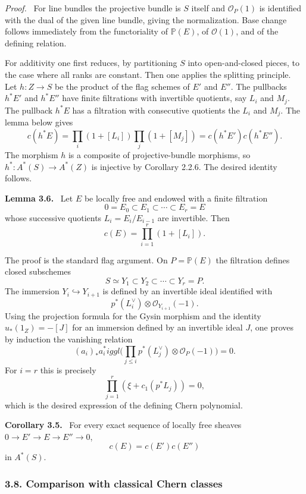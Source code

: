 \documentclass[14pt]{extarticle}
\newcommand{\cO}{\mathcal O}
\newenvironment{statement}[1]{\par\medskip\noindent\textbf{#1.}\ }{\par\medskip}
\newenvironment{prooftext}[1][Proof]{\par\noindent\emph{#1.}\ }{\par\medskip}
\begin{document}
\begin{prooftext}
For line bundles the projective bundle is $S$ itself and $\cO_P(1)$ is identified with the dual of the given line bundle, giving the normalization. Base change follows immediately from the functoriality of $\mathbb P(E)$, of $\cO(1)$, and of the defining relation.

For additivity one first reduces, by partitioning $S$ into open-and-closed pieces, to the case where all ranks are constant. Then one applies the splitting principle. Let $h:Z\to S$ be the product of the flag schemes of $E'$ and $E''$. The pullbacks $h^*E'$ and $h^*E''$ have finite filtrations with invertible quotients, say $L_i$ and $M_j$. The pullback $h^*E$ has a filtration with consecutive quotients the $L_i$ and $M_j$. The lemma below gives
\[
   c(h^*E)=\prod_i(1+[L_i])\prod_j(1+[M_j])
       =c(h^*E')c(h^*E'').
\]
The morphism $h$ is a composite of projective-bundle morphisms, so $h^*:A^*(S)\to A^*(Z)$ is injective by Corollary 2.2.6. The desired identity follows.
\end{prooftext}

\begin{statement}{Lemma 3.6}
Let $E$ be locally free and endowed with a finite filtration
\[
   0=E_0\subset E_1\subset\cdots\subset E_r=E
\]
whose successive quotients $L_i=E_i/E_{i-1}$ are invertible. Then
\[
   c(E)=\prod_{i=1}^r(1+[L_i]).
\]
\end{statement}

The proof is the standard flag argument. On $P=\mathbb P(E)$ the filtration defines closed subschemes
\[
   S\simeq Y_1\subset Y_2\subset\cdots\subset Y_r=P.
\]
The immersion $Y_i\hookrightarrow Y_{i+1}$ is defined by an invertible ideal identified with
\[
   p^*(L_i^\vee)\otimes\cO_{Y_{i+1}}(-1).
\]
Using the projection formula for the Gysin morphism and the identity $u_*(1_Z)=-[J]$ for an immersion defined by an invertible ideal $J$, one proves by induction the vanishing relation
\[
   (a_i)_*a_i^*\!iggl(\prod_{j\le i}p^*(L_j^\vee)\otimes\cO_P(-1)\biggr)=0.
\]
For $i=r$ this is precisely
\[
   \prod_{j=1}^r(\xi+c_1(p^*L_j))=0,
\]
which is the desired expression of the defining Chern polynomial.

\begin{statement}{Corollary 3.5}
For every exact sequence of locally free sheaves $0\to E'\to E\to E''\to0$,
\[
   c(E)=c(E')c(E'')
\]
in $A^*(S)$.
\end{statement}

\subsubsection*{3.8. Comparison with classical Chern classes}
\end{document}
